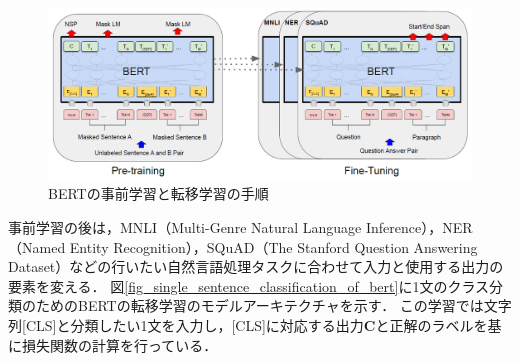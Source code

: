 \documentclass[12pt,a4j]{jreport}
\begin{document}
\begin{figure}[H]
	\centering
	\includegraphics[keepaspectratio, width=120mm]{img/fine-tuning-of-bert.png}
	\caption{BERTの事前学習と転移学習の手順\protect\footnotemark[5]}
	\label{fig_fine_tuning_of_bert}
\end{figure}

事前学習の後は，MNLI（Multi-Genre Natural Language Inference），NER（Named Entity Recognition），SQuAD（The Stanford Question Answering Dataset）などの行いたい自然言語処理タスクに合わせて入力と使用する出力の要素を変える．
図\ref{fig_single_sentence_classification_of_bert}に1文のクラス分類のためのBERTの転移学習のモデルアーキテクチャを示す．
この学習では文字列[CLS]と分類したい1文を入力し，[CLS]に対応する出力$\bm{C}$と正解のラベルを基に損失関数の計算を行っている．

\end{document}
